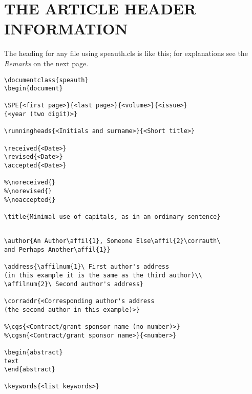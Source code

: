 \documentclass{speauth}
\begin{document}
\section{THE ARTICLE HEADER INFORMATION}
The heading for any file using \textsf{speauth.cls} is like this;
for explanations see the \textit{Remarks}
on the next page. %

\begin{verbatim}
\documentclass{speauth}
\begin{document}

\SPE{<first page>}{<last page>}{<volume>}{<issue>}
{<year (two digit)>}

\runningheads{<Initials and surname>}{<Short title>}

\received{<Date>}
\revised{<Date>}
\accepted{<Date>}

%\noreceived{}
%\norevised{}
%\noaccepted{}

\title{Minimal use of capitals, as in an ordinary sentence}

\end{verbatim} \newpage %
\begin{verbatim}

\author{An Author\affil{1}, Someone Else\affil{2}\corrauth\ 
and Perhaps Another\affil{1}}

\address{\affilnum{1}\ First author's address
(in this example it is the same as the third author)\\
\affilnum{2}\ Second author's address}

\corraddr{<Corresponding author's address 
(the second author in this example)>}

%\cgs{<Contract/grant sponsor name (no number)>}
%\cgsn{<Contract/grant sponsor name>}{<number>}

\begin{abstract}
text
\end{abstract}

\keywords{<list keywords>}
\end{verbatim}
\end{document}
